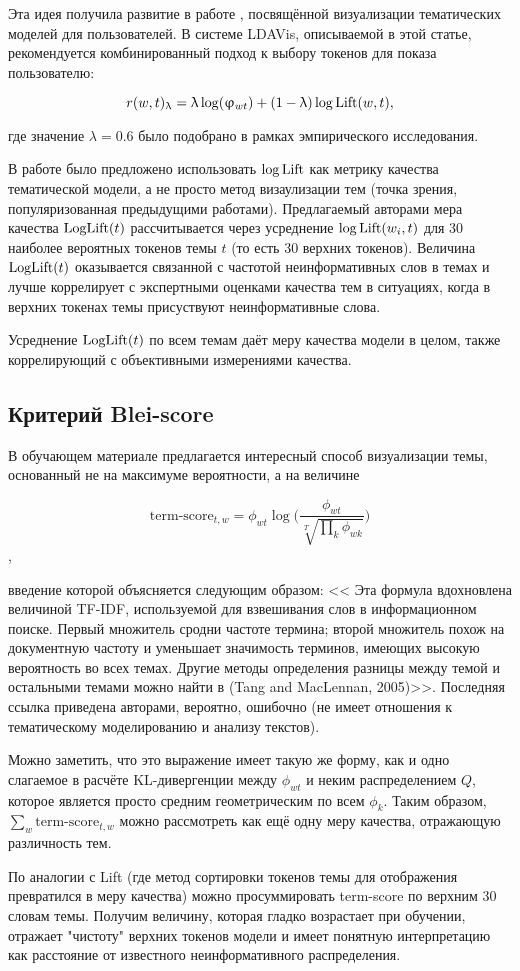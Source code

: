 Эта идея получила развитие в работе \cite{ldavis2014}, посвящённой визуализации тематических моделей для пользователей. В системе LDAVis, описываемой в этой статье, рекомендуется комбинированный подход к выбору токенов для показа пользователю: 

$$r(w, t)_{\lambda} = \lambda \log(\phi_{wt}) + (1 - \lambda) \log \textup{Lift}(w, t),$$

где значение $\lambda = 0.6$ было подобрано в рамках эмпирического исследования.

В работе \cite{fan2019assessing} было предложено использовать $\log \textup{Lift}$ как метрику качества тематической модели, а не просто метод визаулизации тем (точка зрения, популяризованная предыдущими работами). Предлагаемый авторами мера качества $\textup{LogLift}(t)$ рассчитывается через усреднение $\log \textup{Lift}(w_i, t)$ для 30 наиболее вероятных токенов темы $t$ (то есть 30 верхних токенов). Величина $\textup{LogLift}(t)$ оказывается связанной с частотой неинформативных слов в темах и лучше коррелирует с экспертными оценками качества тем в ситуациях, когда в верхних токенах темы присуствуют неинформативные слова.

Усреднение $\textup{LogLift}(t)$ по всем темам даёт меру качества модели в целом, также коррелирующий с объективными измерениями качества.

\subsection{Критерий Blei-score}

В обучающем материале \cite{Blei_lafferty} предлагается интересный способ визуализации темы, основанный не на максимуме вероятности, а на величине

$$\text{term-score}_{t,w} = \phi_{wt} \log \bigg( \frac{\phi_{wt}}{\sqrt[T]{\prod_k \phi_{wk}}}\bigg)$$,

введение которой объясняется следующим образом: <<
Эта формула вдохновлена величиной TF-IDF, используемой для взвешивания слов в информационном поиске. Первый
множитель сродни частоте термина; второй множитель похож
на документную частоту и уменьшает значимость терминов, имеющих высокую вероятность во всех темах. Другие методы определения разницы между
темой и остальными темами можно найти в (Tang and MacLennan, 2005)>>. Последняя ссылка приведена авторами, вероятно, ошибочно (не имеет отношения к тематическому моделированию и анализу текстов).

Можно заметить, что это выражение имеет такую же форму, как и одно слагаемое в расчёте KL-дивергенции между $\phi_{wt}$ и неким распределением $Q$, которое является просто средним геометрическим по всем $\phi_{k}$. Таким образом, $\sum_{w} \text{term-score}_{t,w}$ можно рассмотреть как ещё одну меру качества, отражающую различность тем.

По аналогии с Lift (где метод сортировки токенов темы для отображения превратился в меру качества) можно просуммировать term-score по верхним 30 словам темы. Получим величину, которая гладко возрастает при обучении, отражает "чистоту" верхних токенов модели и имеет понятную интерпретацию как расстояние от известного неинформативного распределения.

